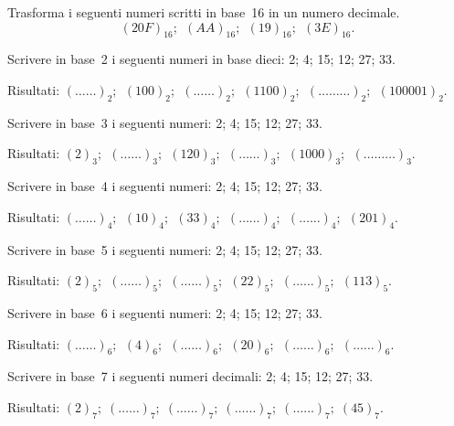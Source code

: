 \begin{esercizio}
\label{ese:4.5}
Trasforma i seguenti numeri scritti in base~16 in un numero decimale.
\[(20F)_{16};\:\:(AA)_{16};\:\:(19)_{16};\:\:(3E)_{16}.\]
\end{esercizio}


\begin{esercizio}
\label{ese:4.6}
Scrivere in base~2 i seguenti numeri in base dieci: 2; 4; 15; 12; 27; 33.

Risultati:
$(\ldots\ldots)_{2};\:\:(100)_{2};\:\:(\ldots\ldots)_{2};\:\:(1100)_{2};\:\:(\ldots\ldots\ldots)_{2};\:\:(100001)_{2}$.
\end{esercizio}

\begin{esercizio}
\label{ese:4.7}
Scrivere in base~3 i seguenti numeri: 2; 4; 15; 12; 27; 33.

Risultati:
$(2)_{3};\:\:(\ldots\ldots)_{3};\:\:(120)_{3};\:\:(\ldots\ldots)_{3};\:\:(1000)_{3};\:\:(\ldots\ldots\ldots)_{3}$.
\end{esercizio}

\begin{esercizio}
\label{ese:4.8}
Scrivere in base~4 i seguenti numeri: 2; 4; 15; 12; 27; 33.

Risultati:
$(\ldots\ldots)_{4};\:\:(10)_{4};\:\:(33)_{4};\:\:(\ldots\ldots)_{4};\:\:(\ldots\ldots)_{4};\:\:(201)_{4}$.
\end{esercizio}

\begin{esercizio}
\label{ese:4.9}
Scrivere in base~5 i seguenti numeri: 2; 4; 15; 12; 27; 33.

Risultati:
$(2)_{5};\:\:(\ldots\ldots)_{5};\:\:(\ldots\ldots)_{5};\:\:(22)_{5};\:\:(\ldots\ldots)_{5};\:\:(113)_{5}$.
\end{esercizio}

\begin{esercizio}
\label{ese:4.10}
Scrivere in base~6 i seguenti numeri: 2; 4; 15; 12; 27; 33.

Risultati:
$(\ldots\ldots)_{6};\:\:(4)_{6};\:\:(\ldots\ldots)_{6};\:\:(20)_{6};\:\:(\ldots\ldots)_{6};\:\:(\ldots\ldots)_{6}$.
\end{esercizio}

\begin{esercizio}
\label{ese:4.11}
Scrivere in base~7 i seguenti numeri decimali: 2; 4; 15; 12; 27; 33.

Risultati:
$(2)_{7};\;(\ldots\ldots)_{7};\;(\ldots\ldots)_{7};\;(\ldots\ldots)_{7};\;(\ldots\ldots)_{7};\;(45)_{7}$.
\end{esercizio}


